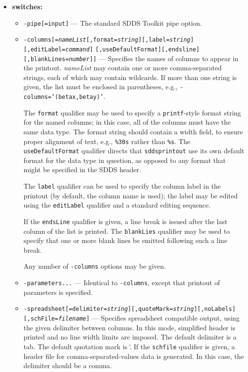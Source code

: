 \begin{itemize}
\item {\bf switches:}
    \begin{itemize}
    \item {\tt -pipe[=input]} --- The standard SDDS Toolkit pipe option.
    \item {\tt -columns[={\em nameList}[,format={\em string}][,label={\em string}][,editLabel={\em command}]}
        {\tt [,useDefaultFormat][,endsline][,blankLines={\em number}]]} --- Specifies the names of 
        columns to appear in the printout.  {\em nameList} may contain one or more comma-separated
        strings, each of which may contain wildcards.  If more than one string is given, the list
        must be enclosed in parentheses, e.g., {\tt -columns='(betax,betay)'}.  

        The {\tt format} qualifier may be used to specify a {\tt printf}-style format string for the
        named columns; in this case, all of the columns must have the same data type.  The format
        string should contain a width field, to ensure proper alignment of text, e.g., \verb|%30s|
        rather than \verb|%s|. The {\tt useDefaultFormat} qualifier directs that {\tt sddsprintout}
        use its own default format for the data type in question, as opposed to any format that might
        be specified in the SDDS header.

        The {\tt label} qualifier can be used to specify the column label in the
        printout (by default, the column name is used); the label may be edited using the
        {\tt editLabel} qualifier and a standard editing sequence.

        If the {\tt endsLine} qualifier is given, a line break is issued after the last column of the
        list is printed.  The {\tt blankLies} qualifier may be used to specify that one or more
        blank lines be emitted following such a line break.

        Any number of {\tt -columns} options may be given.

    \item {\tt -parameters...} --- Identical to {\tt -columns}, except that printout of parameters
        is specified.


    \item {\tt -spreadsheet[=delimiter={\em string}][,quoteMark={\em string}][,noLabels][,schFile={\em filename}]} --- Specifies spreadsheet compatible output,
        using the given delimiter between columns. In this mode, simplified header is printed and
        no line width limits are imposed.  The default delimiter is a tab.  The default quotation mark
        is \".  If the {\tt schfile} qualifier is given, a header file for comma-separated-values
        data is generated. In this case, the delimiter should be a comma.


\end{itemize}
\end{itemize}
